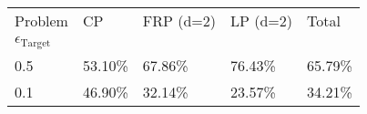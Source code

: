 \begin{tabular}{lllll}
Problem & CP & FRP (d=2) & LP (d=2) & Total \\
$\epsilon_{{\text{{Target}}}}$ &  &  &  &  \\
0.5 & 53.10\% & 67.86\% & 76.43\% & 65.79\% \\
\cline{1-5}
0.1 & 46.90\% & 32.14\% & 23.57\% & 34.21\% \\
\cline{1-5}
\end{tabular}
